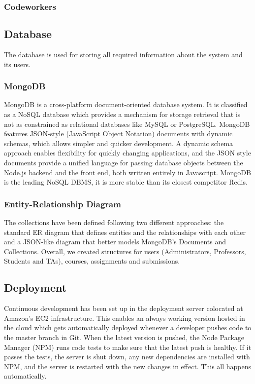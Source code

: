 \subsubsection{Codeworkers}

\subsection{Database}

The database is used for storing all required information about the system and
its users.

\subsubsection{MongoDB}

MongoDB is a cross-platform document-oriented database system. It is classified
as a NoSQL database which provides a mechanism for storage retrieval that is not
as constrained as relational databases like MySQL or PostgreSQL. MongoDB
features JSON-style (JavaScript Object Notation) documents with dynamic schemas,
which allows simpler and quicker development. A dynamic schema approach enables
flexibility for quickly changing applications, and the JSON style documents
provide a unified language for passing database objects between the Node.js
backend and the front end, both written entirely in Javascript. MongoDB is the
leading NoSQL DBMS, it is more stable than its closest competitor Redis.

\subsubsection{Entity-Relationship Diagram}

The collections have been defined following two different approaches: the
standard ER diagram that defines entities and the relationships with each other
and a JSON-like diagram that better models MongoDB's Documents and Collections.
Overall, we created structures for users (Administrators, Professors, Students
and TAs), courses, assignments and submissions.




\subsection{Deployment}

Continuous development has been set up in the deployment server colocated at
Amazon's EC2 infrastructure. This enables an always working version hosted in
the cloud which gets automatically deployed whenever a developer pushes code to
the master branch in Git. When the latest version is pushed, the Node Package
Manager (NPM) runs code tests to make sure that the latest push is healthy. If
it passes the tests, the server is shut down, any new dependencies are installed
with NPM, and the server is restarted with the new changes in effect. This all
happens automatically.

